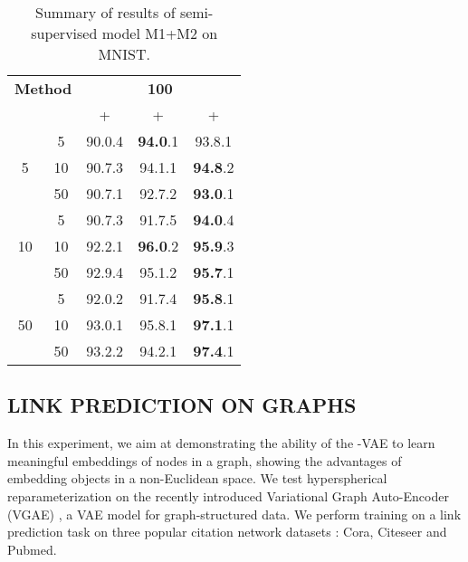 \documentclass[letterpaper]{article}
\newcommand{\Sv}{}
\newcommand{\Nv}{}
\begin{document}
\begin{table}[!ht]
    \centering
    \caption{Summary of results of semi-supervised model M1+M2 on MNIST.}
    \bigskip
    \begin{tabular}{cc|ccc}
    \toprule
    \multicolumn{2}{c}{\textbf{Method}} &
      \multicolumn{3}{c}{\textbf{100}} \\
       & 
      & \Nv+\Nv & \Sv+\Sv & \Sv+\Nv  \\
        \midrule
    \multirow{3}{*}{5}  & 5   & 90.0{\tiny.4} & {\bf94.0}{\tiny.1} & 93.8{\tiny.1} \\
                        & 10  & 90.7{\tiny.3} & 94.1{\tiny.1} & {\bf94.8}{\tiny.2} \\
                        & 50  & 90.7{\tiny.1} & 92.7{\tiny.2} & {\bf93.0}{\tiny.1} \\
    \midrule
    \multirow{3}{*}{10} & 5   & 90.7{\tiny.3} & 91.7{\tiny.5} & {\bf94.0}{\tiny.4} \\
                        & 10  & 92.2{\tiny.1} & {\bf96.0}{\tiny.2} & {\bf95.9}{\tiny.3}\\
                        & 50  & 92.9{\tiny.4} & 95.1{\tiny.2} & {\bf95.7}{\tiny.1} \\
    \midrule
    \multirow{3}{*}{50} & 5   & 92.0{\tiny.2} & 91.7{\tiny.4} & {\bf95.8}{\tiny.1} \\
                        & 10  & 93.0{\tiny.1} & 95.8{\tiny.1} & {\bf97.1}{\tiny.1} \\
                        & 50  & 93.2{\tiny.2} & 94.2{\tiny.1} & {\bf97.4}{\tiny.1} \\
    \bottomrule
    \end{tabular}
    \label{tab:m1m2}
\end{table}

\subsection{LINK PREDICTION ON GRAPHS}

In this experiment, we aim at demonstrating the ability of the \Sv-VAE to learn meaningful embeddings of nodes in a graph, showing the advantages of embedding objects in a non-Euclidean space. We test hyperspherical reparameterization on the recently introduced Variational Graph Auto-Encoder (VGAE) \citep{kipf2016VGAE}, a VAE model for graph-structured data. We perform training on a link prediction task on three popular citation network datasets \citep{sen2008collective}: Cora, Citeseer and Pubmed.
\end{document}
